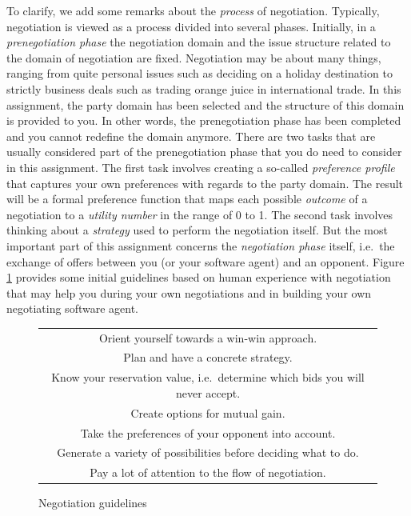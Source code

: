 \documentclass[a4paper]{article}
\begin{document}
To clarify, we add some remarks about the {\em process} of negotiation. Typically, negotiation is viewed as a process divided into several phases. Initially, in a {\em prenegotiation phase} the negotiation domain and the issue structure related to the domain of negotiation are fixed. Negotiation may be about many things, ranging from quite personal issues such as deciding on a holiday destination to strictly business deals such as trading orange juice in international trade. In this assignment, the party domain has been selected and the structure of this domain is provided to you. In other words, the prenegotiation phase has been completed and you cannot redefine the domain anymore. There are two tasks that are usually considered part of the prenegotiation phase that you do need to consider in this assignment. The first task involves creating a so-called {\em preference profile} that captures your own preferences with regards to the party domain. The result will be a formal preference function that maps each possible {\em outcome} of a negotiation to a {\em utility number} in the range of 0 to 1. The second task involves thinking about a {\em strategy} used to perform the negotiation itself. But the most important part of this assignment concerns the {\em negotiation phase} itself, i.e.\ the exchange of offers between you (or your software agent) and an opponent. Figure \ref{fig:hints} provides some initial guidelines based on human experience with negotiation that may help you during your own negotiations and in building your own negotiating software agent.

\begin{figure}[h]
\begin{center}
\doublespacing
\begin{tabular}{|c|}
\hline
Orient yourself towards a win-win approach.\\
Plan and have a concrete strategy.\\
Know your reservation value, i.e.\ determine which bids you will never accept.\\
Create options for mutual gain.\\
Take the preferences of your opponent into account.\\
Generate a variety of possibilities before deciding what to do.\\
Pay a lot of attention to the flow of negotiation.\\
\hline
\end{tabular}
\end{center}
\caption{Negotiation guidelines}\label{fig:hints}
\singlespacing
\end{figure}
\end{document}
